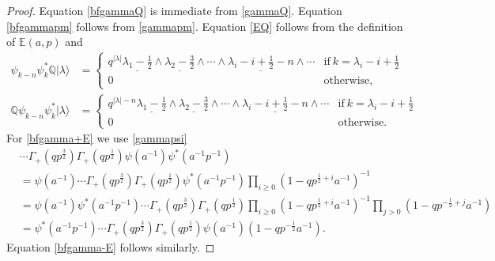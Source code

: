 \documentclass{amsart}
\theoremstyle{definition}
\newcommand{\QQ} {\mathbb{Q}}		%
\newcommand{\EE}{\mathbb{E}}
\begin{document}
\begin{proof}
Equation \eqref{bfgammaQ} is immediate from \eqref{gammaQ}. Equation \eqref{bfgammapm} follows from \eqref{gammapm}. Equation \eqref{EQ} follows from the definition of $\EE(a,p)$ and
\begin{align*}
\psi_{k-n} \psi_{k}^{*} \QQ | \lambda \rangle &= \left\{ \begin{array}{cc} q^{|\lambda|} \underline{\lambda_1 - \frac{1}{2}} \wedge \underline{\lambda_{2} - \frac{3}{2}} \wedge \cdots \wedge \underline{\lambda_i - i + \frac{1}{2} - n} \wedge \cdots & \mathrm{if \ } k = \lambda_i - i + \frac{1}{2} \\ 0 & \mathrm{otherwise}, \end{array} \right. \\
\QQ \psi_{k-n} \psi_{k}^{*} | \lambda \rangle &= \left\{ \begin{array}{cc} q^{|\lambda|-n} \underline{\lambda_1 - \frac{1}{2}} \wedge \underline{\lambda_{2} - \frac{3}{2}} \wedge \cdots \wedge \underline{\lambda_i - i + \frac{1}{2} - n} \wedge \cdots & \mathrm{if \ } k = \lambda_i - i + \frac{1}{2} \\ 0 & \mathrm{otherwise}. \end{array} \right.
\end{align*}
For \eqref{bfgamma+E} we use \eqref{gammapsi}
\begin{align*}
&\cdots \Gamma_+(q p^{\frac{3}{2}}) \Gamma_+(q p^{\frac{1}{2}}) \psi(a^{-1}) \psi^*(a^{-1} p^{-1}) \\
&= \psi(a^{-1}) \cdots \Gamma_+(q p^{\frac{3}{2}}) \Gamma_+(q p^{\frac{1}{2}}) \psi^*(a^{-1} p^{-1}) \prod_{i \geq 0} (1-q p^{\frac{1}{2}+i} a^{-1})^{-1} \\
&= \psi(a^{-1}) \psi^*(a^{-1} p^{-1}) \cdots \Gamma_+(q p^{\frac{3}{2}}) \Gamma_+(q p^{\frac{1}{2}}) \prod_{i \geq 0} (1-q p^{\frac{1}{2}+i} a^{-1})^{-1} \prod_{j > 0} (1-q p^{-\frac{1}{2}+j} a^{-1}) \\
&= \psi^*(a^{-1} p^{-1}) \cdots \Gamma_+(q p^{\frac{3}{2}}) \Gamma_+(q p^{\frac{1}{2}}) \psi(a^{-1}) (1-q p^{-\frac{1}{2}} a^{-1}).
\end{align*}
Equation \eqref{bfgamma-E} follows similarly.
\end{proof}
\end{document}
